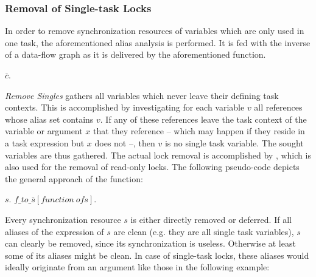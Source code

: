 \subsubsection{Removal of Single-task Locks}
In order to remove synchronization resources of variables which are only used in one task, the aforementioned alias analysis is performed. It is fed with the inverse of a data-flow graph as it is delivered by the aforementioned function. 
\begin{algorithmic}
 
    \State $\overline{c}$. 
  \EndIf
\EndFor
\State {}
\EndFunction
\end{algorithmic}
\textit{Remove Singles} gathers all variables which never leave their defining task contexts. This is accomplished by investigating for each variable $v$ all references whose alias set contains $v$. If any of these references leave the task context of the variable or argument $x$ that they reference -- which may happen if they reside in a task expression but $x$ does not --, then $v$ is no single task variable. The sought variables are thus gathered. The actual lock removal is accomplished by , which is also used for the removal of read-only locks. The following pseudo-code depicts the general approach of the function:
\begin{algorithmic}
 
   
    \State $s$.
  \Else
    \State $\mathit{f\_to\_\overline{s}}[\mathit{function\ of }s]$. 
  \EndIf
\EndFor

  \State {}
\EndFor

\EndFunction
\end{algorithmic}
Every synchronization resource $s$ is either directly removed or deferred. If all aliases of the expression of $s$ are clean (e.g. they are all single task variables), $s$ can clearly be removed, since its synchronization is useless. Otherwise at least some of its aliases might be clean. In case of single-task locks, these aliases would ideally originate from an argument like those in the following example:
